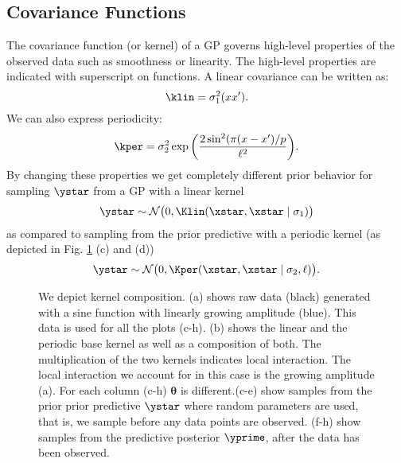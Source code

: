 \subsection{Covariance Functions}
The covariance function (or kernel) of a \ac{GP} governs high-level properties
of the observed data such as smoothness or linearity. The high-level properties
are indicated with superscript on functions.  A linear covariance can be written as:
\begin{equation}\label{eq:LIN1}
    \klin =   \sigma_1^2(x x^\prime).
\end{equation}
We can also express periodicity:
\begin{equation}\label{eq:PER1}
    \kper =  \sigma_2^2 \exp \bigg( \frac{2 \sin^2 ( \pi (x - x^\prime)/p}{\ell^2} \bigg). 
\end{equation}
By changing these properties we get completely different prior behavior for sampling $\ystar$ from a
\ac{GP} with a linear kernel
\[
\ystar \sim \mathcal{N}\big(0,\Klin(\xstar,\xstar \mid \sigma_1 )\big)
\]
as compared to sampling from the prior predictive with a periodic kernel (as depicted in 
Fig. \ref{fig:composition_tutorial} (c) and (d))
\[
\ystar \sim \mathcal{N}\big(0,\Kper(\xstar,\xstar \mid \sigma_2, \ell )\big).
\]
\begin{figure}

\caption{We depict kernel composition. 
(a) shows raw data (black) generated with a sine function with linearly growing amplitude (blue).
This data is used for all the plots (c-h). 
(b) shows the linear and the periodic base kernel as well as a composition of both. 
The multiplication of the two kernels indicates local interaction. The local interaction we account for in this case is the growing amplitude (a). For each column (c-h) $\bm{\theta}$ is different.(c-e) show samples from the prior
prior predictive $\ystar$ where random parameters are used, that is, we sample before any data points are observed.
(f-h) show samples from the predictive posterior $\yprime$, after the data has been observed.}
\label{fig:composition_tutorial}
\end{figure}
